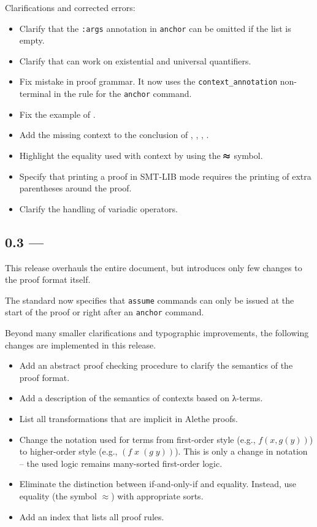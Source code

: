 \noindent
Clarifications and corrected errors:
\begin{itemize}
  \item Clarify that the \texttt{:args} annotation in \texttt{anchor} can be
        omitted if the list is empty.
  \item Clarify that  can work on existential and universal
        quantifiers.
  \item Fix mistake in proof grammar.  It now uses the \texttt{context\_annotation}
        non-terminal in the rule for the \texttt{anchor} command.
  \item Fix the example of .
  \item Add the missing context to the conclusion of ,
        , , .
  \item Highlight the equality used with context by using the $\operatorname{\pmb{\approx}}$ symbol.
  \item Specify that printing a proof in SMT-LIB mode requires the printing
        of extra parentheses around the proof.
  \item Clarify the handling of variadic operators.
\end{itemize}

\subsection*{0.3 --- }

This release overhauls the entire document, but introduces only few
changes to the proof format itself.

The standard now specifies that \texttt{assume} commands can only be
issued at the start of the proof or right after an \texttt{anchor}
command.

Beyond many smaller clarifications and typographic improvements, the
following changes are implemented in this release.
\begin{itemize}
  \item Add an abstract proof checking procedure to clarify
  the semantics of the proof format.
  \item Add a description of the semantics of contexts based on λ-terms.
  \item List all transformations that are implicit in Alethe proofs.
  \item Change the notation used for terms from first-order style
   (e.g., $f(x,g(y))$) to higher-order style (e.g.,
   $(f\;x\;(g\;y))$).  This is only a change in notation -- the used logic
   remains many-sorted first-order logic.
  \item Eliminate the distinction between if-and-only-if and
  equality.  Instead, use equality (the symbol $≈$) with appropriate
   sorts.
  \item Add an index that lists all proof rules.
\end{itemize}

